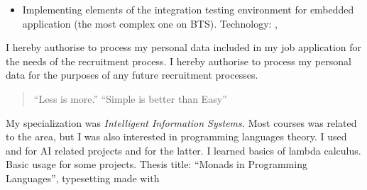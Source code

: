 \documentclass[10pt,a4paper,ragged2e,withhyper]{altacv}
\begin{document}
\begin{paracol}{2}
\medskip

\begin{itemize}
\item 
  Implementing elements of the integration testing environment for embedded
  application (the most complex one on BTS). Technology:   
     ,  
\end{itemize}

\medskip

{\tiny I hereby authorise \CompanyName to process my personal data included in my job application for the needs of the recruitment process. I hereby authorise \CompanyName to process my personal data for the purposes of any future recruitment processes.}

\newpage

\switchcolumn


\begin{quote}
``Less is more.''
``Simple is better than Easy''
\end{quote}


\divider


\medskip


  My specialization was \textit{Intelligent Information Systems.} Most courses was
  related to the area, but I was also interested in programming languages
  theory. I used    and  for AI related projects and 
  for the latter. I learned basics of lambda calculus. Basic usage  for
  some projects. Thesis title: “Monads in Programming Languages”,
  typesetting made with 


\end{paracol}
\end{document}
